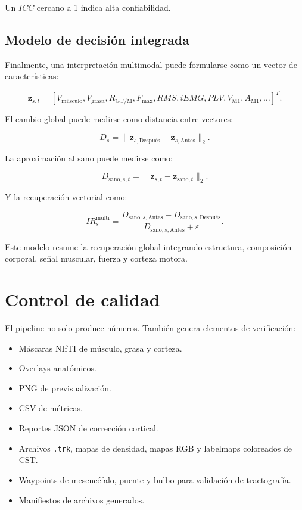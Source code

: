 \documentclass[12pt,a4paper]{article}
\begin{document}
Un \(ICC\) cercano a 1 indica alta confiabilidad.

\subsection{Modelo de decisión integrada}

Finalmente, una interpretación multimodal puede formularse como un vector de características:

\[
\mathbf{z}_{s,t}
=
[
V_{\text{músculo}},
V_{\text{grasa}},
R_{\text{GT/M}},
F_{\max},
RMS,
iEMG,
PLV,
V_{\text{M1}},
A_{\text{M1}},
\ldots
]^T.
\]

El cambio global puede medirse como distancia entre vectores:

\[
D_s
=
\|
\mathbf{z}_{s,\text{Después}}
-
\mathbf{z}_{s,\text{Antes}}
\|_2.
\]

La aproximación al sano puede medirse como:

\[
D_{\text{sano},s,t}
=
\|
\mathbf{z}_{s,t}
-
\mathbf{z}_{\text{sano},t}
\|_2.
\]

Y la recuperación vectorial como:

\[
IR^{\text{multi}}_s
=
\frac{
D_{\text{sano},s,\text{Antes}}
-
D_{\text{sano},s,\text{Después}}
}
{
D_{\text{sano},s,\text{Antes}}+\varepsilon
}.
\]

Este modelo resume la recuperación global integrando estructura, composición corporal, señal muscular, fuerza y corteza motora.


\section{Control de calidad}

El pipeline no solo produce números. También genera elementos de verificación:

\begin{itemize}
    \item Máscaras NIfTI de músculo, grasa y corteza.
    \item Overlays anatómicos.
    \item PNG de previsualización.
    \item CSV de métricas.
    \item Reportes JSON de corrección cortical.
    \item Archivos \texttt{.trk}, mapas de densidad, mapas RGB y labelmaps coloreados de CST.
    \item Waypoints de mesencéfalo, puente y bulbo para validación de tractografía.
    \item Manifiestos de archivos generados.
\end{itemize}
\end{document}

